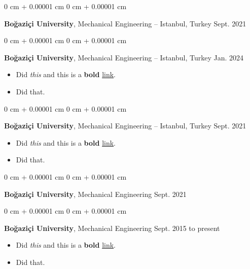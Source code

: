 \documentclass[10pt, letterpaper]{article}
\newenvironment{highlights}{
    \begin{itemize}[
        topsep=0.10 cm,
        parsep=0.10 cm,
        partopsep=0pt,
        itemsep=0pt,
        leftmargin=0 cm + 10pt
    ]
}{
    \end{itemize}
        
    \vspace{-0.20cm}
} %
\newenvironment{onecolentry}{
    \begin{adjustwidth}{
        0 cm + 0.00001 cm
    }{
        0 cm + 0.00001 cm
    }
}{
    \end{adjustwidth}
} %
\begin{document}
        \vspace{0.1 cm}

        \begin{onecolentry}
            \textbf{Boğaziçi University}, Mechanical Engineering -- Istanbul, Turkey \hfill Sept. 2021
        \end{onecolentry}

        \vspace{0.1 cm}

        \begin{onecolentry}
            \textbf{Boğaziçi University}, Mechanical Engineering -- Istanbul, Turkey \hfill Jan. 2024
            \begin{highlights}
                \item Did \textit{this} and this is a \textbf{bold} \href{https://example.com}{link}.
                \item Did that.
            \end{highlights}
        \end{onecolentry}

        \vspace{0.1 cm}

        \begin{onecolentry}
            \textbf{Boğaziçi University}, Mechanical Engineering -- Istanbul, Turkey \hfill Sept. 2021
            \begin{highlights}
                \item Did \textit{this} and this is a \textbf{bold} \href{https://example.com}{link}.
                \item Did that.
            \end{highlights}
        \end{onecolentry}

        \vspace{0.1 cm}

        \begin{onecolentry}
            \textbf{Boğaziçi University}, Mechanical Engineering \hfill Sept. 2021
        \end{onecolentry}

        \vspace{0.1 cm}

        \begin{onecolentry}
            \textbf{Boğaziçi University}, Mechanical Engineering \hfill Sept. 2015 to present
            \begin{highlights}
                \item Did \textit{this} and this is a \textbf{bold} \href{https://example.com}{link}.
                \item Did that.
            \end{highlights}
        \end{onecolentry}
\end{document}
